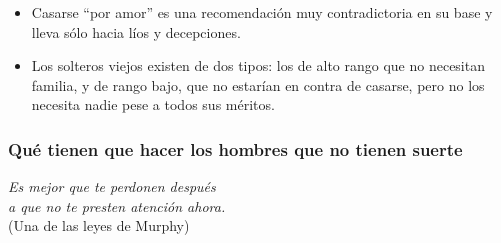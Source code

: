 \begin{itemize}

\item
  Casarse ``por amor'' es una recomendación muy contradictoria en su
  base y lleva sólo hacia líos y decepciones.
\item
  Los solteros viejos existen de dos tipos: los de alto rango que no
  necesitan familia, y de rango bajo, que no estarían en contra de
  casarse, pero no los necesita nadie pese a todos sus méritos.
\end{itemize}

\protect\hypertarget{M17}{}{}

\hypertarget{quuxe9-tienen-que-hacer-los-hombres-que-no-tienen-suerte}{\subsubsection{Qué tienen que hacer los hombres que no tienen suerte}
\label{quuxe9-tienen-que-hacer-los-hombres-que-no-tienen-suerte}}

\noindent
\textit{Es mejor que te perdonen después}\\
\textit{a que no te presten atención ahora.}\\
(Una de las leyes de Murphy)\\



